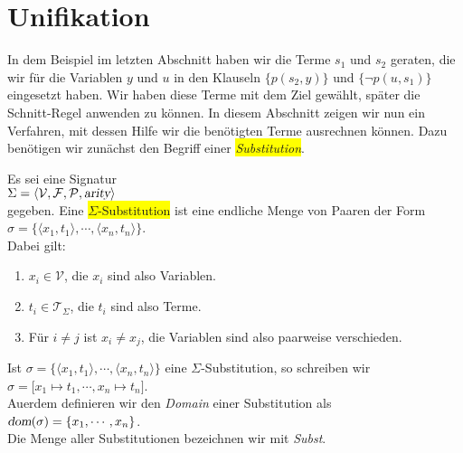 \section{Unifikation}
In dem  Beispiel im letzten Abschnitt haben wir die Terme $s_1$ und $s_2$ geraten, die wir f\"{u}r die Variablen
$y$ und $u$ in den Klauseln $\big\{ p(s_2,y) \big\}$ und  $\big\{\neg p(u,s_1)\big\}$
eingesetzt haben.  Wir haben diese Terme mit dem Ziel gew\"{a}hlt, sp\"{a}ter die Schnitt-Regel
anwenden zu k\"{o}nnen.  In diesem Abschnitt zeigen wir nun ein Verfahren, mit dessen Hilfe
wir die ben\"{o}tigten Terme ausrechnen k\"{o}nnen.
Dazu ben\"{o}tigen wir zun\"{a}chst den Begriff einer \colorbox{yellow}{\emph{Substitution}}.
\begin{Definition}[Substitution]
    Es sei eine Signatur \\[0.2cm]
    \hspace*{1.3cm} $\Sigma = \langle \mathcal{V}, \mathcal{F}, \mathcal{P}, \textsl{arity} \rangle$ \\[0.2cm]
    gegeben.  Eine \colorbox{yellow}{$\Sigma$-Substitution} ist eine endliche Menge von Paaren der Form \\[0.2cm]
    \hspace*{1.3cm} $\sigma = \bigl\{ \langle x_1, t_1 \rangle, \cdots, \langle x_n, t_n \rangle \bigr\}$. \\[0.2cm]
    Dabei gilt:
    \begin{enumerate}
    \item $x_i \in \mathcal{V}$, die $x_i$ sind also Variablen.
    \item $t_i \in \mathcal{T}_\Sigma$, die $t_i$ sind also Terme.
    \item F\"{u}r $i\not=j$ ist $x_i \not= x_j$, die Variablen sind also paarweise verschieden.
    \end{enumerate}
    
    Ist $\sigma = \bigl\{ \langle x_1, t_1 \rangle, \cdots, \langle x_n, t_n \rangle \bigr\}$ eine
    $\Sigma$-Substitution, so schreiben wir  \\[0.2cm]
    \hspace*{1.3cm} $\sigma = \bigl[ x_1 \mapsto t_1, \cdots, x_n \mapsto t_n \bigr]$.  \\[0.2cm]
    Au\3erdem definieren wir den \emph{Domain} einer Substitution als \\[0.2cm]
    \hspace*{1.3cm} $\textsl{dom}(\sigma) = \{ x_1, \cdots, x_n\}$.
    \\[0.2cm]
    Die Menge aller Substitutionen bezeichnen wir mit \textsl{Subst}.
    \eox
\end{Definition}

